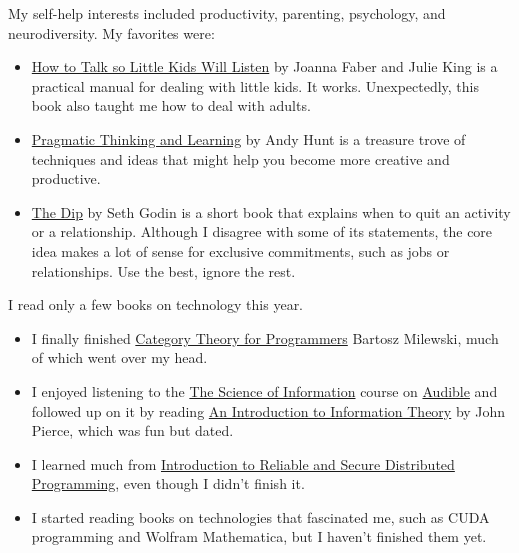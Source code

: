\documentclass{article}
\begin{document}
My self-help interests included productivity, parenting, psychology, and neurodiversity.
My favorites were:
\begin{itemize}
\item
\href{https://www.goodreads.com/book/show/29430725-how-to-talk-so-little-kids-will-listen}{How to Talk so Little Kids Will Listen} by Joanna Faber and Julie King is a practical manual for dealing with little kids.
It works.
Unexpectedly, this book also taught me how to deal with adults.
\item
\href{https://www.goodreads.com/book/show/3063393-pragmatic-thinking-and-learning}{Pragmatic Thinking and Learning} by Andy Hunt is a treasure trove of techniques and ideas that might help you become more creative and productive.
\item
\href{https://www.goodreads.com/book/show/324748.The_Dip}{The Dip} by Seth Godin is a short book that explains when to quit an activity or a relationship.
Although I disagree with some of its statements, the core idea makes a lot of sense for exclusive commitments, such as jobs or relationships.
Use the best, ignore the rest.
\end{itemize}

I read only a few books on technology this year.
\begin{itemize}
\item
I finally finished \href{https://www.goodreads.com/book/show/33618151-category-theory-for-programmers}{Category Theory for Programmers} Bartosz Milewski, much of which went over my head.
\item
I enjoyed listening to the \href{https://www.thegreatcourses.com/courses/the-science-of-information-from-language-to-black-holes}{The Science of Information} course on \href{https://www.audible.de/pd/The-Science-of-Information-From-Language-to-Black-Holes-Hoerbuch/1629976067}{Audible}
and followed up on it by reading \href{https://www.goodreads.com/book/show/433443.An_Introduction_to_Information_Theory}{An Introduction to Information Theory} by John Pierce, which was fun but dated.
\item
I learned much from \href{https://www.goodreads.com/book/show/10064443-introduction-to-reliable-and-secure-distributed-programming}{Introduction to Reliable and Secure Distributed Programming}, even though I didn't finish it.
\item
I started reading books on technologies that fascinated me, such as CUDA programming and Wolfram Mathematica, but I haven't finished them yet.
\end{itemize}
\end{document}
